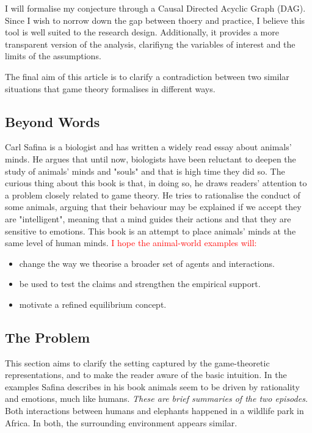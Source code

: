 \vspace*{1em}
I will formalise my conjecture through a Causal Directed Acyclic Graph (DAG). Since I wish to norrow down the gap between thoery and practice, I believe this tool is well suited to the research design. Additionally, it provides a more transparent version of the analysis, clarifiyng the variables of interest and the limits of the assumptions.

\vspace*{1em}
The final aim of this article is to clarify a contradiction between two similar situations that game theory formalises in different ways.


\subsection{Beyond Words}
Carl Safina is a biologist and has written a widely read essay \parencite{safinaWordsWhatAnimals2015} about animals' minds. He argues that until now, biologists have been reluctant to deepen the study of animals' minds and "souls" and that is high time they did so. The curious thing about this book is that, in doing so, he draws readers' attention to a problem closely related to game theory.
He tries to rationalise the conduct of some animals, arguing that their behaviour may be explained if we accept they are "intelligent", meaning that a mind guides their actions and that they are sensitive to emotions. This book is an attempt to place animals' minds at the same level of human minds.
\textcolor{red}{I hope the animal-world examples will:} 

\begin{itemize}
  \item change the way we theorise a broader set of agents and interactions.
  \item be used to test the claims and strengthen the empirical support.
  \item motivate a refined equilibrium concept.
\end{itemize}

\subsection{The Problem} \label{sub:problem}
This section aims to clarify the setting captured by the game-theoretic representations, and to make the reader aware of the basic intuition.
In the examples Safina describes in his book \parencite{safinaWordsWhatAnimals2015} animals seem to be driven by rationality and emotions, much like humans. 
\textit{These are brief summaries of the two episodes.}
Both interactions between humans and elephants happened in a wildlife park in Africa. In both, the surrounding environment appears similar.

